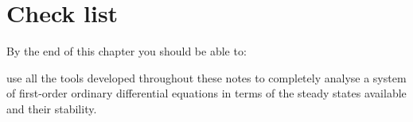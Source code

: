\section{Check list}
By the end of this chapter you should be able to:
\begin{todolist}
\item use all the tools developed throughout these notes to completely analyse a system of first-order ordinary differential equations in terms of the steady states available and their stability.
\end{todolist}







